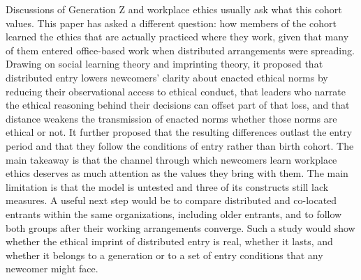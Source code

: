 Discussions of Generation Z and workplace ethics usually ask what this cohort values. This paper has asked a different question: how members of the cohort learned the ethics that are actually practiced where they work, given that many of them entered office-based work when distributed arrangements were spreading. Drawing on social learning theory and imprinting theory, it proposed that distributed entry lowers newcomers' clarity about enacted ethical norms by reducing their observational access to ethical conduct, that leaders who narrate the ethical reasoning behind their decisions can offset part of that loss, and that distance weakens the transmission of enacted norms whether those norms are ethical or not. It further proposed that the resulting differences outlast the entry period and that they follow the conditions of entry rather than birth cohort. The main takeaway is that the channel through which newcomers learn workplace ethics deserves as much attention as the values they bring with them. The main limitation is that the model is untested and three of its constructs still lack measures. A useful next step would be to compare distributed and co-located entrants within the same organizations, including older entrants, and to follow both groups after their working arrangements converge. Such a study would show whether the ethical imprint of distributed entry is real, whether it lasts, and whether it belongs to a generation or to a set of entry conditions that any newcomer might face.
